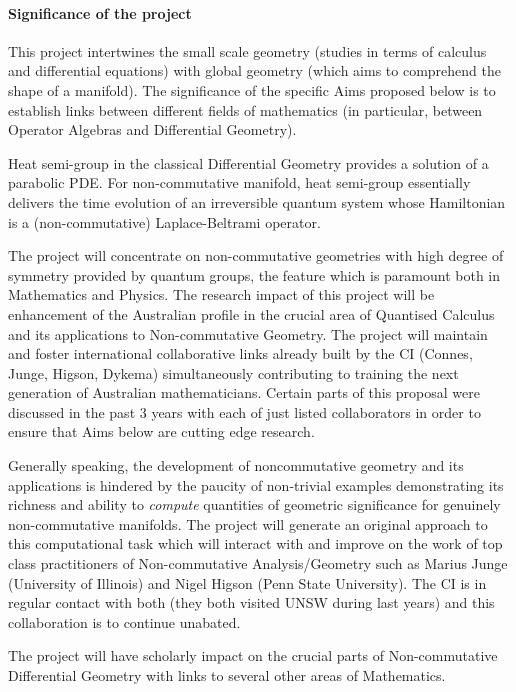 \documentclass[12pt]{article}
\begin{document}
\paragraph*{Significance of the project} This project intertwines the small scale geometry (studies in terms of calculus and differential equations) with global geometry (which aims to comprehend the shape of a manifold). The significance of the specific Aims proposed below is to establish links between different fields of mathematics (in particular, between Operator Algebras and Differential Geometry).

Heat semi-group in the classical Differential Geometry provides a solution of a parabolic PDE. For non-commutative manifold, heat semi-group essentially delivers the time evolution of an irreversible quantum system whose Hamiltonian is a (non-commutative) Laplace-Beltrami operator.

The project will concentrate on non-commutative geometries with high degree of symmetry provided by quantum groups, the feature which is paramount both in Mathematics and Physics. The research impact of this project will be enhancement of the Australian profile in the crucial area of Quantised Calculus and its applications to Non-commutative Geometry. The project will maintain and foster international collaborative links already built by the CI (Connes, Junge, Higson, Dykema) simultaneously contributing to training the next generation of Australian mathematicians. Certain parts of this proposal were discussed in the past 3 years with each of just listed collaborators in order to ensure that Aims below are cutting edge research.

Generally speaking, the development of noncommutative geometry and its applications is hindered by the paucity of non-trivial examples demonstrating its richness and ability to {\it compute} quantities of geometric significance for genuinely non-commutative manifolds. The project will generate an original approach to this computational task which will interact with and improve on the work of top class practitioners of Non-commutative Analysis/Geometry such as Marius Junge (University of Illinois) and Nigel Higson (Penn State University). The CI is in regular contact with both (they both visited UNSW during last years) and this collaboration is to continue unabated.

The project will have scholarly impact on the crucial parts of Non-commutative Differential Geometry with links to several other areas of Mathematics. 
\end{document}
